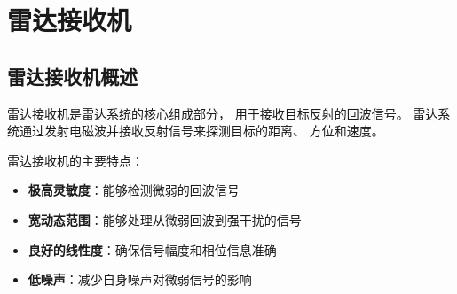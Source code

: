 
\chapter{雷达接收机}
\label{chap:radar_receiver}

\section{雷达接收机概述}
\label{sec:radar_receiver_intro}

雷达接收机是雷达系统的核心组成部分，
用于接收目标反射的回波信号。
雷达系统通过发射电磁波并接收反射信号来探测目标的距离、
方位和速度。

雷达接收机的主要特点：
\begin{itemize}
    \item \textbf{极高灵敏度}：能够检测微弱的回波信号
    \item \textbf{宽动态范围}：能够处理从微弱回波到强干扰的信号
    \item \textbf{良好的线性度}：确保信号幅度和相位信息准确
    \item \textbf{低噪声}：减少自身噪声对微弱信号的影响
\end{itemize}

